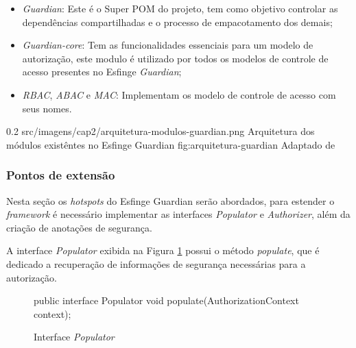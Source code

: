\begin{itemize}
    \item \textit{Guardian}: Este é o Super POM  do projeto, tem como objetivo controlar as dependências compartilhadas e o processo de empacotamento dos demais;
    
    \item \textit{Guardian-core}: Tem as funcionalidades essenciais para um modelo de autorização, este modulo é utilizado por todos os modelos de controle de acesso presentes no Esfinge \textit{Guardian};
    
    \item \textit{RBAC}, \textit{ABAC} e \textit{MAC}: Implementam os modelo de controle de acesso com seus nomes.
 
\end{itemize}

\begin{image}
{0.2} %
{src/imagens/cap2/arquitetura-modulos-guardian.png} %
{Arquitetura dos módulos existêntes no Esfinge Guardian} %
{fig:arquitetura-guardian} %
{Adaptado de } %
\end{image}

\subsubsection{Pontos de extensão}

\par Nesta seção os \textit{hotspots} do Esfinge Guardian serão abordados, para estender o \textit{framework} é necessário implementar as interfaces \textit{Populator} e \textit{Authorizer}, além da criação de anotações de segurança.

\par A interface \textit{Populator} exibida na Figura \ref{fig:interface-populator} possui o método \textit{populate}, que é dedicado a recuperação de informações de segurança necessárias para a autorização. 

\begin{figure}[H]
    \centering
    \caption{Interface \textit{Populator}}
    \begin{java}
public interface Populator {
	void populate(AuthorizationContext context);
}
    \end{java}
    \label{fig:interface-populator}
\end{figure}

